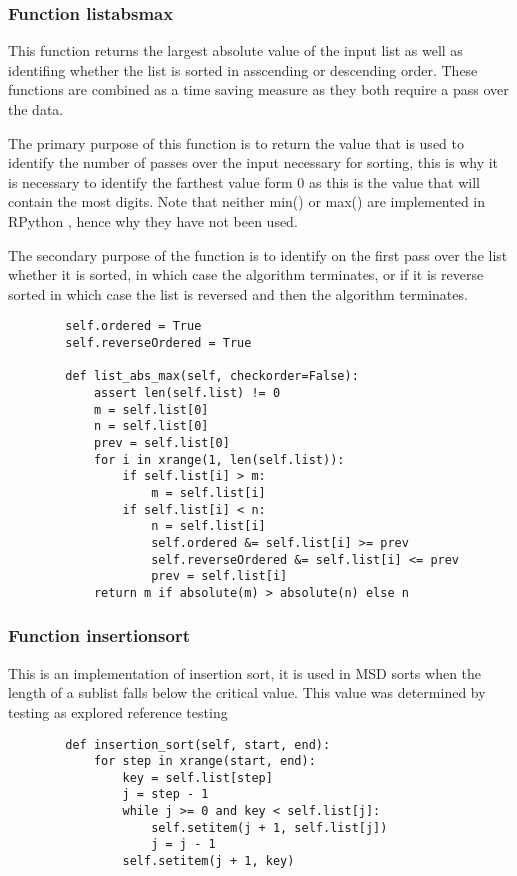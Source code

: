 \documentclass[12pt]{article}
\begin{document}
\subsubsection{Function list\textunderscore abs\textunderscore max}
This function returns the largest absolute value of the input list as well as identifing whether the list is sorted in asscending or descending order. These functions are combined as a time saving measure as they both require a pass over the data.
\par
The primary purpose of this function is to return the value that is used to identify the number of passes over the input necessary for sorting, this is why it is necessary to identify the farthest value form 0 as this is the value that will contain the most digits. Note that neither min() or max() are implemented in RPython \cite{rpythonobj}, hence why they have not been used.
\par
The secondary purpose of the function is to identify on the first pass over the list whether it is sorted, in which case the algorithm terminates, or if it is reverse sorted in which case the list is reversed and then the algorithm terminates.
\begin{lstlisting}
        self.ordered = True
        self.reverseOrdered = True

        def list_abs_max(self, checkorder=False):
            assert len(self.list) != 0
            m = self.list[0]
            n = self.list[0]
            prev = self.list[0]
            for i in xrange(1, len(self.list)):
                if self.list[i] > m:
                    m = self.list[i]
                if self.list[i] < n:
                    n = self.list[i]
					self.ordered &= self.list[i] >= prev
					self.reverseOrdered &= self.list[i] <= prev
					prev = self.list[i]
            return m if absolute(m) > absolute(n) else n
      \end{lstlisting}
\pagebreak
\subsubsection{Function insertion\textunderscore sort}
This is an implementation of insertion sort, it is used in MSD sorts when the length of a sublist falls below the critical value. This value was determined by testing as explored  {\color{red} reference testing}
\begin{lstlisting}
        def insertion_sort(self, start, end):
            for step in xrange(start, end):
                key = self.list[step]
                j = step - 1
                while j >= 0 and key < self.list[j]:
                    self.setitem(j + 1, self.list[j])
                    j = j - 1
                self.setitem(j + 1, key)
      \end{lstlisting}
\end{document}
